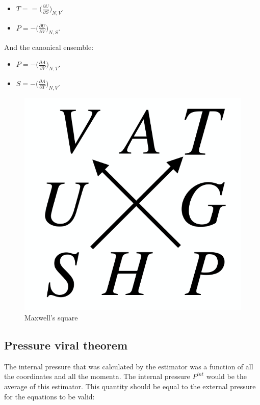 	\begin{multicols}{2}
		\begin{itemize}
			\item $T = =\biggl(\frac{\partial U}{\partial S}\biggr)_{N, V}$.
			\item $P = - \biggl(\frac{\partial U}{\partial V}\biggr)_{N, S}$.
		\end{itemize}
	\end{multicols}

	And the canonical ensemble:

	\begin{multicols}{2}
		\begin{itemize}
			\item $P = -\biggl(\frac{\partial A}{\partial V}\biggr)_{N, T}$.
			\item $S = - \biggl(\frac{\partial A}{\partial T}\biggr)_{N, V}$.
		\end{itemize}
	\end{multicols}

	\begin{figure}[H]
		\includegraphics[scale = 0.1]{maxwell_square}
		\centering
		\caption{Maxwell's square}
	\end{figure}


	\subsection{Pressure viral theorem}
	The internal pressure that was calculated by the estimator was a function of all the coordinates and all the momenta.
	The internal pressure $P^{int}$ would be the average of this estimator.
	This quantity should be equal to the external pressure for the equations to be valid:

